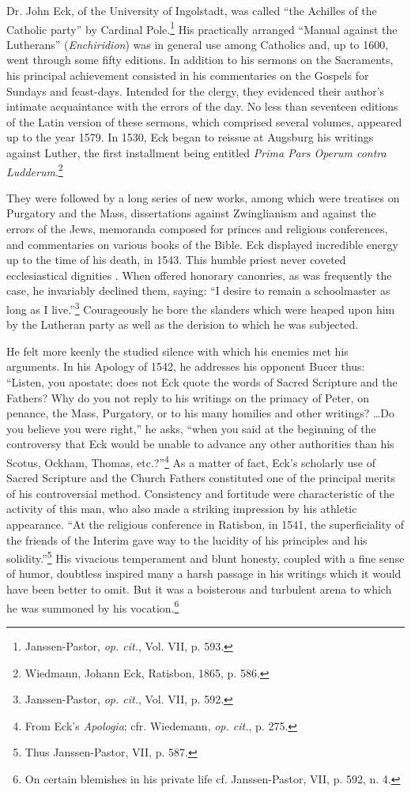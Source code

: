 Dr. John Eck, of the University of Ingolstadt, was called “the
Achilles of the Catholic party” by Cardinal Pole.\footnote{Janssen-Pastor, \textit{op. cit.}, Vol. VII, p. 593.}
 His practically arranged
“Manual against the Lutherans” (\textit{Enchiridion}) was in general
use among Catholics and, up to 1600, went through some fifty editions.
In addition to his sermons on the Sacraments, his principal
achievement consisted in his commentaries on the Gospels for Sundays
and feast-days. Intended for the clergy, they evidenced their author’s
intimate acquaintance with the errors of the day. No less than
seventeen editions of the Latin version of these sermons, which comprised
several volumes, appeared up to the year 1579. In 1530, Eck
began to reissue at Augsburg his writings against Luther, the first
installment being entitled \textit{Prima Pars Operum contra Ludderum}.\footnote{Wiedmann, Johann Eck, Ratisbon, 1865, p. 586.}

They were followed by a long series of new works, among which were
treatises on Purgatory and the Mass, dissertations against Zwinglianism
and against the errors of the Jews, memoranda composed for
princes and religious conferences, and commentaries on various books
of the Bible. Eck displayed incredible energy up to the time of his
death, in 1543. This humble priest never coveted ecclesiastical dignities
. When offered honorary canonries, as was frequently the case, he
invariably declined them, saying: “I desire to remain a schoolmaster
as long as I live.”\footnote{Janssen-Pastor, \textit{op. cit.}, Vol. VII, p. 592.}
 Courageously he bore the slanders which were
heaped upon him by the Lutheran party as well as the derision to
which he was subjected.

He felt more keenly the studied silence with which his enemies met
his arguments. In his Apology of 1542, he addresses his opponent
Bucer thus: “Listen, you apostate; does not Eck quote the words of
Sacred Scripture and the Fathers? Why do you not reply to his writings
on the primacy of Peter, on penance, the Mass, Purgatory, or to
his many homilies and other writings? \dots Do you believe you were
right,” he asks, “when you said at the beginning of the controversy
that Eck would be unable to advance any other authorities than his
Scotus, Ockham, Thomas, etc.?”\footnote{From Eck’s \textit{Apologia}; cfr. Wiedemann, \textit{op. cit.}, p. 275.}
 As a matter of fact, Eck’s
scholarly use of Sacred Scripture and the Church Fathers constituted
one of the principal merits of his controversial method. Consistency
and fortitude were characteristic of the activity of this man, who
also made a striking impression by his athletic appearance. “At the
religious conference in Ratisbon, in 1541, the superficiality of the
friends of the Interim gave way to the lucidity of his principles and
his solidity.”\footnote{Thus Janssen-Pastor, VII, p. 587.}
 His vivacious temperament and blunt honesty, coupled
with a fine sense of humor, doubtless inspired many a harsh passage in
his writings which it would have been better to omit. But it was a
boisterous and turbulent arena to which he was summoned by his
vocation.\footnote{On certain blemishes in his private life cf. Janssen-Pastor, VII, p. 592, n. 4.}

